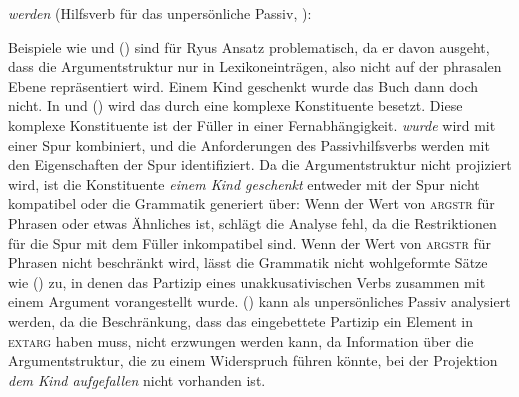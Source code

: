 {\eas
\emph{werden} (Hilfsverb für das unpersönliche Passiv, \citealt[]{Ryu97a}):\\
\zs

\noindent
Beispiele wie  und () sind für
Ryus Ansatz problematisch, da er davon ausgeht, dass die Argumentstruktur
nur in Lexikoneinträgen, also nicht auf der phrasalen Ebene repräsentiert wird.
\ea
Einem Kind    geschenkt wurde das Buch       dann doch      nicht.
\z
In  und () wird das \vf durch eine
komplexe Konstituente besetzt. Diese komplexe Konstituente ist der Füller in einer
Fernabhängigkeit. \emph{wurde} wird mit einer Spur kombiniert, und die Anforderungen
des Passivhilfsverbs werden mit den Eigenschaften der Spur identifiziert.
Da die Argumentstruktur nicht projiziert wird, ist die Konstituente
\emph{einem Kind geschenkt} entweder mit der Spur nicht kompatibel
oder die Grammatik generiert über:
Wenn der Wert von \textsc{argstr} für Phrasen  oder etwas Ähnliches ist,
schlägt die Analyse fehl, da die Restriktionen für die Spur mit dem Füller inkompatibel sind.
Wenn der Wert von \textsc{argstr} für Phrasen nicht beschränkt wird, lässt
die Grammatik nicht wohlgeformte Sätze wie () zu, in denen das Partizip eines
unakkusativischen Verbs zusammen mit einem Argument vorangestellt wurde.
\z
() kann als unpersönliches Passiv analysiert werden, da die Beschränkung,
dass das eingebettete Partizip ein Element in \textsc{extarg} haben muss, nicht 
erzwungen werden kann, da Information über die Argumentstruktur, die zu einem Widerspruch führen
könnte, bei der Projektion \emph{dem Kind aufgefallen} nicht vorhanden ist.




}
